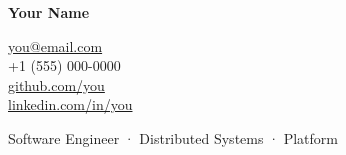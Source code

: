 \documentclass[a4paper]{article}
\begin{document}
\noindent\colorbox{darkbg}{\begin{minipage}{\textwidth}
\vspace{18pt}
\hspace{20pt}
{\Huge\color{white}\textbf{Your Name}}
\hfill
\begin{minipage}[b]{0.4\textwidth}
\raggedleft
{\footnotesize\color{lighttext}
\href{mailto:you@email.com}{you@email.com} \\
+1 (555) 000-0000 \\
\href{https://github.com/you}{github.com/you} \\
\href{https://linkedin.com/in/you}{linkedin.com/in/you}
}
\end{minipage}
\hspace{16pt}

\vspace{4pt}
\hspace{20pt}
{\large\color{accentblue} Software Engineer · Distributed Systems · Platform}
\vspace{14pt}
\end{minipage}}
\end{document}

